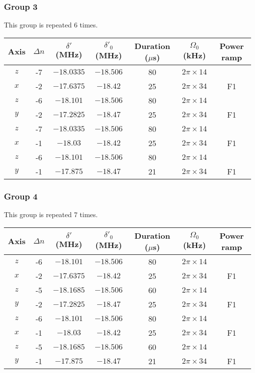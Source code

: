 \documentclass[aps,secnumarabic,amsmath,amssymb]{revtex4}
\begin{document}
\subsubsection{Group 3}
This group is repeated 6 times.
\begin{center}
  \begin{tabular}{|c|c|c|c|c|c|c|}
    \hline
    Axis&$\Delta n$&$\delta'$ (MHz)&$\delta'_0$ (MHz)&Duration ($\mu$s)& $\Omega_0$ (kHz)&Power ramp\\\hline
    $z$&-7&$-18.0335$&$-18.506$&80&$2\pi\times14$&\\\hline
    $x$&-2&$-17.6375$&$-18.42$&25&$2\pi\times34$&F1\\\hline
    $z$&-6&$-18.101$&$-18.506$&80&$2\pi\times14$&\\\hline
    $y$&-2&$-17.2825$&$-18.47$&25&$2\pi\times34$&F1\\\hline
    $z$&-7&$-18.0335$&$-18.506$&80&$2\pi\times14$&\\\hline
    $x$&-1&$-18.03$&$-18.42$&25&$2\pi\times34$&F1\\\hline
    $z$&-6&$-18.101$&$-18.506$&80&$2\pi\times14$&\\\hline
    $y$&-1&$-17.875$&$-18.47$&21&$2\pi\times34$&F1\\\hline
  \end{tabular}
\end{center}

\newpage
\subsubsection{Group 4}
This group is repeated 7 times.
\begin{center}
  \begin{tabular}{|c|c|c|c|c|c|c|}
    \hline
    Axis&$\Delta n$&$\delta'$ (MHz)&$\delta'_0$ (MHz)&Duration ($\mu$s)& $\Omega_0$ (kHz)&Power ramp\\\hline
    $z$&-6&$-18.101$&$-18.506$&80&$2\pi\times14$&\\\hline
    $x$&-2&$-17.6375$&$-18.42$&25&$2\pi\times34$&F1\\\hline
    $z$&-5&$-18.1685$&$-18.506$&60&$2\pi\times14$&\\\hline
    $y$&-2&$-17.2825$&$-18.47$&25&$2\pi\times34$&F1\\\hline
    $z$&-6&$-18.101$&$-18.506$&80&$2\pi\times14$&\\\hline
    $x$&-1&$-18.03$&$-18.42$&25&$2\pi\times34$&F1\\\hline
    $z$&-5&$-18.1685$&$-18.506$&60&$2\pi\times14$&\\\hline
    $y$&-1&$-17.875$&$-18.47$&21&$2\pi\times34$&F1\\\hline
  \end{tabular}
\end{center}
\end{document}
